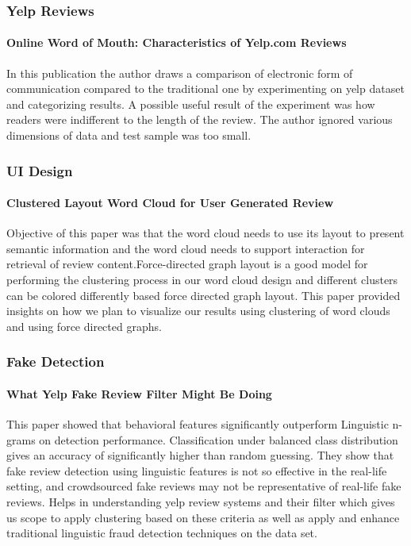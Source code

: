 \documentclass[12pt]{article} %
\begin{document}
\subsubsection{Yelp Reviews}

\paragraph{Online Word of Mouth: Characteristics of Yelp.com Reviews}
In this publication the author draws a comparison of electronic form of communication compared to the traditional one by experimenting on yelp dataset and categorizing results. A possible useful result of the experiment was how readers were indifferent to the length of the review. The author ignored various dimensions of data and test sample was too small.

\subsubsection{UI Design}

\paragraph{Clustered Layout Word Cloud for User Generated Review}
Objective of this paper was that the word cloud needs to use its layout to present semantic information and the word cloud needs to support interaction for retrieval of review content.Force-directed graph layout is a good model for performing the clustering process in our word cloud design and different clusters can be colored differently based force directed graph layout. This paper provided insights on how we plan to visualize our results using clustering of word clouds and using force directed graphs.

\subsubsection{Fake Detection}

\paragraph{What Yelp Fake Review Filter Might Be Doing}
This paper showed that behavioral features significantly outperform Linguistic n-grams on detection performance. Classification under balanced class distribution gives an accuracy of significantly higher than random guessing. They show that fake review detection using linguistic features is not so effective in the real-life setting, and crowdsourced fake reviews may not be representative of real-life fake reviews. Helps in understanding yelp review systems and their filter which gives us scope to apply clustering based on these criteria as well as apply and enhance traditional linguistic fraud detection techniques on the data set. 
\end{document}
